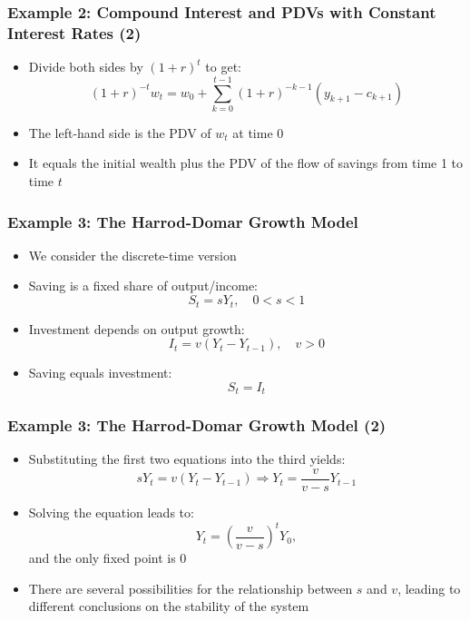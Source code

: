 \documentclass[10pt,usenames,dvipsnames]{beamer}
\theoremstyle{definition}
\begin{document}
\begin{frame}[fragile]
\frametitle{Example 2: Compound Interest and PDVs with Constant Interest Rates (2)}
\begin{itemize}
	\item Divide both sides by $(1 + r)^{t}$ to get:
	\[
		(1+r)^{-t}w_{t} = w_{0} + \sum_{k=0}^{t-1}(1+r)^{-k-1}(y_{k+1} - c_{k+1})
	\]
	\item The left-hand side is the PDV of $w_{t}$ at time 0
	\item It equals the initial wealth plus the PDV of the flow of savings from time 1 to time $t$
\end{itemize}
\end{frame}

\begin{frame}[fragile]
\frametitle{Example 3: The Harrod-Domar Growth Model}
\begin{itemize}
	\item We consider the discrete-time version
	\item Saving is a fixed share of output/income:
	\[
		S_{t} = s Y_{t},\quad 0 < s < 1
	\]
	\item Investment depends on output growth:
	\[
		I_{t} = v(Y_{t} - Y_{t-1}), \quad v > 0
	\]
	\item Saving equals investment:
	\[
		S_{t} = I_{t}
	\]
\end{itemize}
\end{frame}

\begin{frame}[fragile]
\frametitle{Example 3: The Harrod-Domar Growth Model (2)}
\begin{itemize}
	\item Substituting the first two equations into the third yields:
	\[
		sY_{t} = v(Y_{t} - Y_{t-1}) \Rightarrow Y_{t} = \frac{v}{v-s}Y_{t-1}
	\]
	\item Solving the equation leads to:
	\[
		Y_{t} = \left(\frac{v}{v-s}\right)^{t}Y_{0},
	\]
	and the only fixed point is 0
	\item There are several possibilities for the relationship between $s$ and $v$, leading to different conclusions on the stability of the system
\end{itemize}
\end{frame}
\end{document}
